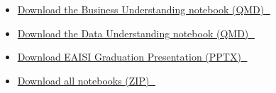 \documentclass[
  american,
  10,
  a4paper,
]{book}
\providecommand{\tightlist}{%
  \setlength{\itemsep}{0pt}\setlength{\parskip}{0pt}}
\theoremstyle{definition}
\theoremstyle{remark}
\begin{document}
\begin{itemize}
\tightlist
\item
  \href{../notebooks/01_business_understanding.qmd}{Download the
  Business Understanding notebook (QMD) 💾}
\item
  \href{../notebooks/02_data_understanding.qmd}{Download the Data
  Understanding notebook (QMD) 💾}
\item
  \href{../pptx/PAF+s03.pptx}{Download EAISI Graduation Presentation
  (PPTX) 💾}
\item
  \href{notebooks.zip}{Download all notebooks (ZIP) 💾}
\end{itemize}


\backmatter
\end{document}
